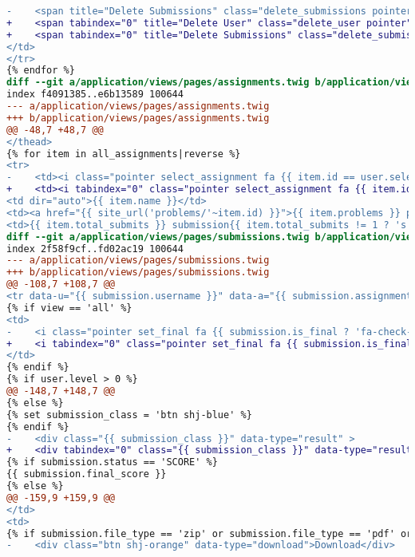 \begin{itemize}
\begin{lstlisting}[language=diff, caption=Perubahan untuk mematuhi kriteria 2.1.1, label=lst_2.1.1, basicstyle=\ttfamily, frame=single,
columns=fullflexible, keepspaces=true, breaklines=true]
-    <span title="Delete Submissions" class="delete_submissions pointer"><i class="fa fa-times-circle fa-lg color1"></i></span>
+    <span tabindex="0" title="Delete User" class="delete_user pointer"><i title="Delete User" class="fa fa-times fa-lg color2"></i></span>
+    <span tabindex="0" title="Delete Submissions" class="delete_submissions pointer"><i class="fa fa-times-circle fa-lg color1"></i></span>
</td>
</tr>
{% endfor %}
diff --git a/application/views/pages/assignments.twig b/application/views/pages/assignments.twig
index f4091385..e6b13589 100644
--- a/application/views/pages/assignments.twig
+++ b/application/views/pages/assignments.twig
@@ -48,7 +48,7 @@
</thead>
{% for item in all_assignments|reverse %}
<tr>
-    <td><i class="pointer select_assignment fa {{ item.id == user.selected_assignment.id ? 'fa-check-square-o color6' : 'fa-square-o' }} fa-2x" data-id="{{ item.id }}"></i></td>
+    <td><i tabindex="0" class="pointer select_assignment fa {{ item.id == user.selected_assignment.id ? 'fa-check-square-o color6' : 'fa-square-o' }} fa-2x" data-id="{{ item.id }}"></i></td>
<td dir="auto">{{ item.name }}</td>
<td><a href="{{ site_url('problems/'~item.id) }}">{{ item.problems }} problem{{ item.problems != 1 ? 's' }}</a></td>
<td>{{ item.total_submits }} submission{{ item.total_submits != 1 ? 's' }}</td>
diff --git a/application/views/pages/submissions.twig b/application/views/pages/submissions.twig
index 2f58f9cf..fd02ac19 100644
--- a/application/views/pages/submissions.twig
+++ b/application/views/pages/submissions.twig
@@ -108,7 +108,7 @@
<tr data-u="{{ submission.username }}" data-a="{{ submission.assignment }}" data-p="{{ submission.problem }}" data-s="{{ submission.submit_id }}" {% if view == 'final' and j is even %}class="hl"{% endif %}>
{% if view == 'all' %}
<td>
-    <i class="pointer set_final fa {{ submission.is_final ? 'fa-check-circle-o color11' : 'fa-circle-o' }} fa-2x"></i>
+    <i tabindex="0" class="pointer set_final fa {{ submission.is_final ? 'fa-check-circle-o color11' : 'fa-circle-o' }} fa-2x"></i>
</td>
{% endif %}
{% if user.level > 0 %}
@@ -148,7 +148,7 @@
{% else %}
{% set submission_class = 'btn shj-blue' %}
{% endif %}
-    <div class="{{ submission_class }}" data-type="result" >
+    <div tabindex="0" class="{{ submission_class }}" data-type="result" >
{% if submission.status == 'SCORE' %}
{{ submission.final_score }}
{% else %}
@@ -159,9 +159,9 @@
</td>
<td>
{% if submission.file_type == 'zip' or submission.file_type == 'pdf' or submission.file_type == 'txt' %}
-    <div class="btn shj-orange" data-type="download">Download</div>

\end{lstlisting}
\end{itemize}

